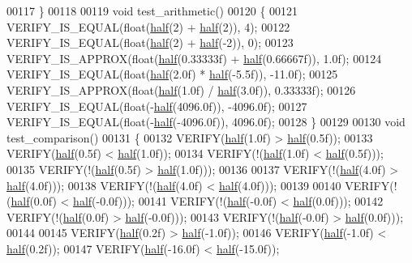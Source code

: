\begin{DoxyCode}
00117 \}
00118 
00119 \textcolor{keywordtype}{void} test\_arithmetic()
00120 \{
00121   VERIFY\_IS\_EQUAL(\textcolor{keywordtype}{float}(\hyperlink{struct_eigen_1_1half}{half}(2) + \hyperlink{struct_eigen_1_1half}{half}(2)), 4);
00122   VERIFY\_IS\_EQUAL(\textcolor{keywordtype}{float}(\hyperlink{struct_eigen_1_1half}{half}(2) + \hyperlink{struct_eigen_1_1half}{half}(-2)), 0);
00123   VERIFY\_IS\_APPROX(\textcolor{keywordtype}{float}(\hyperlink{struct_eigen_1_1half}{half}(0.33333f) + \hyperlink{struct_eigen_1_1half}{half}(0.66667f)), 1.0f);
00124   VERIFY\_IS\_EQUAL(\textcolor{keywordtype}{float}(\hyperlink{struct_eigen_1_1half}{half}(2.0f) * \hyperlink{struct_eigen_1_1half}{half}(-5.5f)), -11.0f);
00125   VERIFY\_IS\_APPROX(\textcolor{keywordtype}{float}(\hyperlink{struct_eigen_1_1half}{half}(1.0f) / \hyperlink{struct_eigen_1_1half}{half}(3.0f)), 0.33333f);
00126   VERIFY\_IS\_EQUAL(\textcolor{keywordtype}{float}(-\hyperlink{struct_eigen_1_1half}{half}(4096.0f)), -4096.0f);
00127   VERIFY\_IS\_EQUAL(\textcolor{keywordtype}{float}(-\hyperlink{struct_eigen_1_1half}{half}(-4096.0f)), 4096.0f);
00128 \}
00129 
00130 \textcolor{keywordtype}{void} test\_comparison()
00131 \{
00132   VERIFY(\hyperlink{struct_eigen_1_1half}{half}(1.0f) > \hyperlink{struct_eigen_1_1half}{half}(0.5f));
00133   VERIFY(\hyperlink{struct_eigen_1_1half}{half}(0.5f) < \hyperlink{struct_eigen_1_1half}{half}(1.0f));
00134   VERIFY(!(\hyperlink{struct_eigen_1_1half}{half}(1.0f) < \hyperlink{struct_eigen_1_1half}{half}(0.5f)));
00135   VERIFY(!(\hyperlink{struct_eigen_1_1half}{half}(0.5f) > \hyperlink{struct_eigen_1_1half}{half}(1.0f)));
00136 
00137   VERIFY(!(\hyperlink{struct_eigen_1_1half}{half}(4.0f) > \hyperlink{struct_eigen_1_1half}{half}(4.0f)));
00138   VERIFY(!(\hyperlink{struct_eigen_1_1half}{half}(4.0f) < \hyperlink{struct_eigen_1_1half}{half}(4.0f)));
00139 
00140   VERIFY(!(\hyperlink{struct_eigen_1_1half}{half}(0.0f) < \hyperlink{struct_eigen_1_1half}{half}(-0.0f)));
00141   VERIFY(!(\hyperlink{struct_eigen_1_1half}{half}(-0.0f) < \hyperlink{struct_eigen_1_1half}{half}(0.0f)));
00142   VERIFY(!(\hyperlink{struct_eigen_1_1half}{half}(0.0f) > \hyperlink{struct_eigen_1_1half}{half}(-0.0f)));
00143   VERIFY(!(\hyperlink{struct_eigen_1_1half}{half}(-0.0f) > \hyperlink{struct_eigen_1_1half}{half}(0.0f)));
00144 
00145   VERIFY(\hyperlink{struct_eigen_1_1half}{half}(0.2f) > \hyperlink{struct_eigen_1_1half}{half}(-1.0f));
00146   VERIFY(\hyperlink{struct_eigen_1_1half}{half}(-1.0f) < \hyperlink{struct_eigen_1_1half}{half}(0.2f));
00147   VERIFY(\hyperlink{struct_eigen_1_1half}{half}(-16.0f) < \hyperlink{struct_eigen_1_1half}{half}(-15.0f));

\end{DoxyCode}
